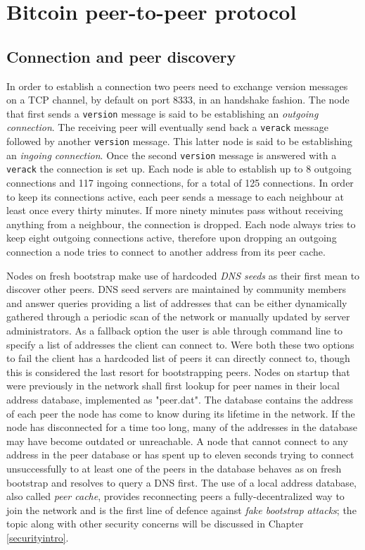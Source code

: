\documentclass[12pt, letterpaper, twoside]{article}
\title{}
\author{}
\begin{document}
\maketitle

\section{Bitcoin peer-to-peer protocol}\label{netintro}
\subsection{Connection and peer discovery}\label{peerdisc}
In order to establish a connection two peers need to exchange version messages on a TCP channel, by default on port 8333, in an handshake fashion. The node that first sends a \texttt{version} message is said to be establishing an \emph{outgoing connection}. The receiving peer will eventually send back a \texttt{verack} message followed by another \texttt{version} message. This latter node is said to be establishing an \emph{ingoing connection}. Once the second \texttt{version} message is answered with a \texttt{verack} the connection is set up. Each node is able to establish up to 8 outgoing connections and 117 ingoing connections, for a total of 125 connections. In order to keep its connections active, each peer sends a message to each neighbour at least once every thirty minutes. If more ninety minutes pass without receiving anything from a neighbour, the connection is dropped. Each node always tries to keep eight outgoing connections active, therefore upon dropping an outgoing connection a node tries to connect to another address from its peer cache.

Nodes on fresh bootstrap make use of hardcoded \emph{DNS seeds} as their first mean to discover other peers. DNS seed servers are maintained by community members and answer queries providing a list of addresses that can be either dynamically gathered through a periodic scan of the network or manually updated by server administrators. As a fallback option the user is able through command line to specify a list of addresses the client can connect to. Were both these two options to fail the client has a hardcoded list of peers it can directly connect to, though this is considered the last resort for bootstrapping peers. Nodes on startup that were previously in the network shall first lookup for peer names in their local address database, implemented as "peer.dat". The database contains the address of each peer the node has come to know during its lifetime in the network. If the node has disconnected for a time too long, many of the addresses in the database may have become outdated or unreachable. A node that cannot connect to any address in the peer database or has spent up to eleven seconds trying to connect unsuccessfully to at least one of the peers in the database behaves as on fresh bootstrap and resolves to query a DNS first. The use of a local address database, also called \emph{peer cache}, provides reconnecting peers a fully-decentralized way to join the network and is the first line of defence against \emph{fake bootstrap attacks}; the topic along with other security concerns will be discussed in Chapter \ref{securityintro}.
\end{document}
